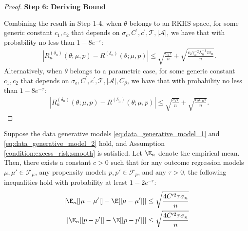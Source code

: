 \begin{proof}
\noindent \textbf{Step 6: Deriving Bound}

\noindent Combining the result in Step 1-4, when $\theta$ belongs to an RKHS space, for some generic constant $c_1,c_2$ that depends on $\sigma_\epsilon,C^\prime,c^\prime,\mathcal{T},|\mathcal{A}|$, we have that with probability no less than $1-8e^{-\tau}$:
\begin{align*}
    &\left|R_n^{({\delta_n})}(\theta;\mu, p)-R^{({\delta_n})}(\theta;\mu, p)\right|\leq \sqrt{\frac{c_1\tau}{n}} + 
    \sqrt{\frac{ c_2\gamma_n^{-2}\lambda_n^{-1}\tau\sigma_n}{n}}.
\end{align*}
Alternatively, when $\theta$ belongs to a parametric case, for some generic constant $c_1,c_2$ that depends on $\sigma_\epsilon,C^\prime,c^\prime,\mathcal{T},|\mathcal{A}|,C_\beta$, we have that with probability no less than $1-8e^{-\tau}$:
\begin{align*}
    &\left|R_n^{({\delta_n})}(\theta;\mu, p)-R^{({\delta_n})}(\theta;\mu, p)\right|\leq \sqrt{\frac{c_1\tau}{n}}+\sqrt{\frac{c_2\sigma_n\tau}{n}}.
\end{align*}


\end{proof}


\begin{lemma}\label{lemma:concentration_mean_diff}
    Suppose the data generative models \eqref{eq:data_generative_model_1} and \eqref{eq:data_generative_model_2} hold, and Assumption \ref{condition:excess_risk:smooth} is satisfied. Let $\E_n$ denote the empirical mean. Then, there exists a constant $c > 0$ such that for any outcome regression models $\mu, \mu' \in \mathcal{F}_\mu$, any propensity models $p, p' \in \mathcal{F}_p$, and any $\tau > 0$, the following inequalities hold with probability at least $1 - 2e^{-\tau}$:
    \begin{align*}
      \left|\E_n[|\mu-\mu^\prime|]-\E[|\mu-\mu^\prime|]\right|\leq \sqrt{\frac{4C^{\prime2}\tau\sigma_n}{n}}\\ 
      \left|\E_n[|p-p^\prime|]-\E[|p-p^\prime|]\right|\leq \sqrt{\frac{4C^{\prime2}\tau\sigma_n}{n}}
    \end{align*}
    
\end{lemma}

